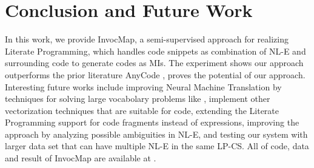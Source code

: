\documentclass[sigconf,review,anonymous]{article}
\begin{document}
\section{Conclusion and Future Work}
In this work, we provide InvocMap, a semi-supervised approach for realizing Literate Programming, which handles code snippets as combination of NL-E and surrounding code to generate codes as MIs. The experiment shows our approach outperforms the prior literature AnyCode \cite{007}, proves the potential of our approach. Interesting future works include improving Neural Machine Translation by techniques for solving large vocabolary problems like \cite{013}, implement other vectorization techniques that are suitable for code, extending the Literate Programming support for code fragments instead of expressions, improving the approach by analyzing possible ambiguities in NL-E, and testing our system with larger data set that can have multiple NL-E in the same LP-CS. All of code, data and result of InvocMap are available at \cite{000}.
\clearpage
{}

\end{document}
